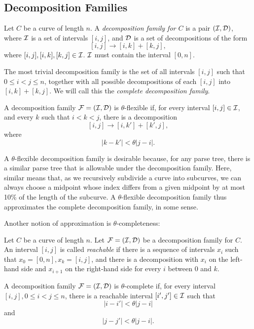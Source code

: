 
\subsection{Decomposition Families}

\begin{defn}
  Let $C$ be a curve of length $n$.  A {\em decomposition family for
    $C$} is a pair $({\mathcal I}, {\mathcal D})$, where ${\mathcal I}$ is a set of intervals
  $[i,j]$, and ${\mathcal D}$ is a set of decompositions of the form
$$[i,j] \to [i,k] + [k,j],$$ where $[i,j], [i,k], [k,j]\in {\mathcal I}$. ${\mathcal I}$
must contain the interval $[0,n]$.
\end{defn}

The most trivial decomposition family is the set of all intervals
$[i,j]$ such that $0\le i < j \le n$, together with all possible
decompositions of each $[i,j]$ into $[i,k] + [k,j]$. We will call this
the {\em complete decomposition family}.

\begin{defn}
  A decomposition family ${\mathcal F}=({\mathcal I},{\mathcal D})$ is $\theta$-flexible if,
  for every interval $[i,j]\in {\mathcal I}$, and every $k$ such that $i<k<j$,
  there is a decomposition
$$[i,j] \to [i,k'] + [k',j],$$
where 
$$|k-k'| < \theta |j-i|.$$
\end{defn}
A $\theta$-flexible decomposition family is desirable because, for any
parse tree, there is a similar parse tree that is allowable under the
decomposition family. Here, similar means that, as we recursively
subdivide a curve into subcurves, we can always choose a midpoint
whose index differs from a given midpoint by at most 10\% of the
length of the subcurve. A $\theta$-flexible decomposition family thus
approximates the complete decomposition family, in some sense.

Another notion of approximation is $\theta$-completeness:
\begin{defn}
  Let $C$ be a curve of length $n$. Let ${\mathcal F}=({\mathcal I},{\mathcal D})$ be a
  decomposition family for $C$.  An interval $[i,j]$ is called {\em
    reachable} if there is a sequence of intervals $x_i$ such that
  $x_0=[0,n], x_k=[i,j]$, and there is a decomposition with $x_i$ on
  the left-hand side and $x_{i+1}$ on the right-hand side for every
  $i$ between $0$ and $k$.
\end{defn}

\begin{defn}
  A decomposition family ${\mathcal F}=({\mathcal I},{\mathcal D})$ is $\theta$-complete if,
  for every interval $[i,j], 0\le i< j \le n$, there is a reachable
  interval $[i',j']\in {\mathcal I}$ such that
$$|i-i'| < \theta |j-i|$$
and
$$|j-j'| < \theta |j-i|.$$
\end{defn}

